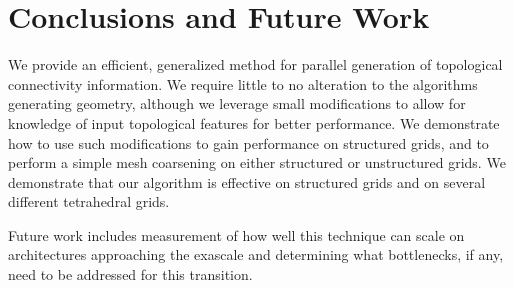 \documentclass[10pt,journal,cspaper,compsoc]{IEEEtran}
\begin{document}
\section{Conclusions and Future Work}
We provide an efficient, generalized method for parallel generation of topological connectivity information. We require little to no alteration to the algorithms generating geometry, although we leverage small modifications to allow for knowledge of input topological features for better performance. We demonstrate how to use such modifications to gain performance on structured grids, and to perform a simple mesh coarsening on either structured or unstructured grids. We demonstrate that our algorithm is effective on structured grids and on several different tetrahedral grids. 

Future work includes measurement of how well this technique can scale on architectures approaching the exascale and determining what bottlenecks, if any, need to be addressed for this transition. 



%
%

\end{document}
